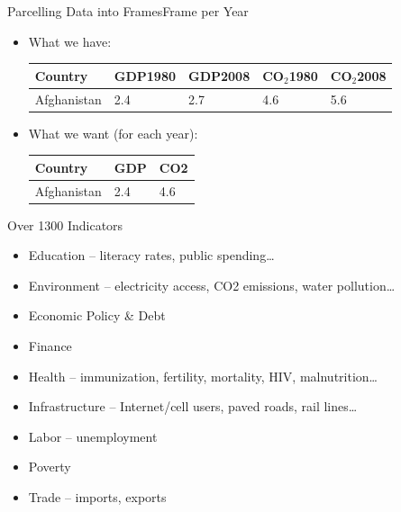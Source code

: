 \documentclass{beamer}
\begin{document}
\begin{frame}{Parcelling Data into Frames}{Frame per Year}
\begin{itemize}
	\item What we have: \\
		\begin{table}
			\begin{tabular}{| l || l | l | l | l |} \hline
			Country		& GDP1980	& GDP2008	& CO$_2$1980	& CO$_2$2008 \\ \hline
			Afghanistan	& 2.4			& 2.7			& 4.6				& 5.6 \\ \hline
			\end{tabular}
		\end{table}
		
	\item What we want (for each year): \\
		\begin{table}
			\begin{tabular}{ | l || l | l | } \hline
			Country     & GDP & CO2 \\ \hline
			Afghanistan & 2.4 & 4.6 \\ \hline
			\end{tabular}
		\end{table}
\end{itemize}
\end{frame}

\begin{frame}{Over 1300 Indicators}
\begin{itemize}
	\item Education -- literacy rates, public spending\dots
	\item Environment -- electricity access, CO2 emissions, water pollution\dots
	\item Economic Policy \& Debt
	\item Finance
	\item Health -- immunization, fertility, mortality, HIV, malnutrition\dots
	\item Infrastructure -- Internet/cell users, paved roads, rail lines\dots
	\item Labor -- unemployment
	\item Poverty
	\item Trade -- imports, exports
\end{itemize}
\end{frame}
\end{document}
